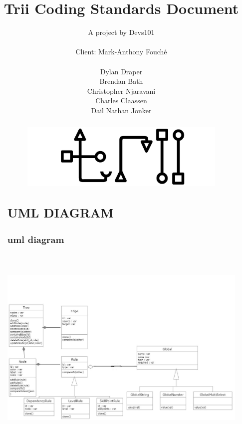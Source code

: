 \documentclass[12pt]{article}
\begin{document}
\title{Trii Coding Standards Document}
\author{A project by Devs101\\ \\
Client: Mark-Anthony Fouché\\ \\
Dylan Draper\\
Brendan Bath\\
Christopher Njaravani\\
Charles Claassen\\
Dail Nathan Jonker\\
}
\maketitle

\begin{abstract}


\begin{figure}
	\includegraphics[width=\linewidth]{images/logo.jpg}
	\label{fig:logo}
\end{figure}
\newpage
{}

\tableofcontents
\newpage

 \section{UML DIAGRAM }
 \subsection{uml diagram}
 \includegraphics[width=15cm, height=10cm]{images/umldiagram.jpg} 

\end{abstract}
\end{document}
